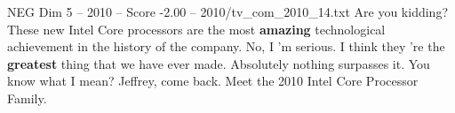 \begin{textsample}{NEG Dim 5 – 2010 – Score -2.00 – 2010/tv\_com\_2010\_14.txt}  \label{ex:f5_neg_024}
Are you kidding?
These new Intel Core processors are the most \textbf{amazing} technological achievement in the history of the company.
No, I 'm serious.
I think they 're the \textbf{greatest} thing that we have ever made.
Absolutely nothing surpasses it.
You know what I mean?
Jeffrey, come back.
Meet the 2010 Intel Core Processor Family.

\end{textsample}
